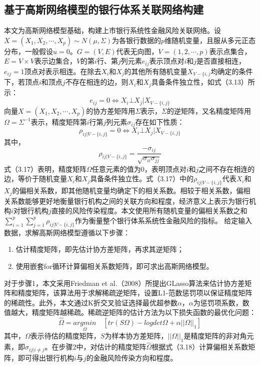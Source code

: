 \documentclass[lang=cn]{elegantpaper}
\begin{document}
\subsection{基于高斯网络模型的银行体系关联网络构建}
本文为高斯网络模型基础，构建上市银行系统性金融风险关联网络。设$X=(X_1,X_2,\cdots,X_p)\sim N(\mu,\Sigma)$为各银行数据的$p$维随机变量，且服从多元正态分布，一般假设$u=0$。$G=(V,E)$代表无向图，$V=(1,2,\cdots,p)$表示点集合，$E=V\times V$表示边集合，$V$的第$i$行、第$j$列元素$e_{ij}$表示顶点对$i$和$j$是否直接相连，$e_{ij}=1$顶点对表示相连。在除去$X_i$和$X_j$的其他所有随机变量$X_{V-\{i,j}$均确定的条件下，若顶点$i$和顶点$j$不存在相连的边，则$X_i$和$X_j$具备条件独立性，如式（3.13）所示：
\begin{equation}
    e_{ij}=0\Longleftrightarrow X_i\bot X_j|X_{V-\{i,j\}}
\end{equation}
向量$X=(X_1,X_2,\cdots,X_p)$的协方差矩阵用$\Sigma$表示，$\Sigma$的逆矩阵，又名精度矩阵用$\Omega=\Sigma^{-1}$表示，精度矩阵第$i$行第$j$列元素$\sigma_{ij}$存在如下性质：
\begin{equation}
    \rho_{ij|V-\{i,j\}}=0\Longleftrightarrow X_i\bot X_j|X_{V-\{i,j\}}
\end{equation}
其中，
\begin{equation}
    \rho_{ij|V-\{i,j\}}=\frac{-\sigma_{ij}}{\sqrt{\sigma_{ii}\sigma_{jj}}}
\end{equation}
式（3.17）表明，精度矩阵$\Omega$任意元素的值为0，表明顶点对$i$和$j$之间不存在相连的边，等价于随机变量$X_i$和$X_j$具备条件独立性。式（3.17）中的$\rho_{ij|V-\{i,j\}}$代表$X_i$和$X_j$的偏相关系数，即其他随机变量均确定下的相关系数。相较于相关系数，偏相关系数能够更好地衡量银行机构之间的关联方向和程度，经济意义上表示为银行机构$i$对银行机构$j$直接的风险传染程度。本文使用所有随机变量的偏相关系数之和$\sum_{i=1}^p \sum_{j=1}^p \rho_{ij|V-\{i,j\}}$作为衡量整个银行体系系统性金融风险的指标。
给定输入数据，求解高斯网络模型遵循以下步骤：
\begin{enumerate}
    \item 估计精度矩阵，即先估计协方差矩阵，再求其逆矩阵；
    \item 使用嵌套for循环计算偏相关系数矩阵，即可求出高斯网络模型。
\end{enumerate}

对于步骤1，本文采用Friedman et al.（2008）所提出GLasso算法来估计协方差矩阵和精度矩阵，该算法用于求解稀疏逆矩阵，设置L1-范数惩罚项以保证精度矩阵的稀疏性。此外，本文通过K折交叉验证选择最优超参数$\alpha$，$\alpha$为惩罚项系数，数值越大，精度矩阵越稀疏。稀疏逆矩阵的估计方法为以下损失函数的最优化问题：
\begin{equation}
    \hat \Omega=\underset{\Omega}{argmin}\quad [tr(S\Omega)-logdet\Omega+\alpha||\Omega||_1]
\end{equation}
其中，$\Omega$表示待估的精度矩阵，$S$为样本协方差矩阵，$||\Omega||_1$是精度矩阵的非对角元素，即$\sigma_{ij|i\neq j}$。在步骤2中，对估计的精度矩阵$\hat\Omega$根据式（3.18）计算偏相关系数矩阵，即可得出银行机构$i$与$j$的金融风险传染方向和程度。
\end{document}
